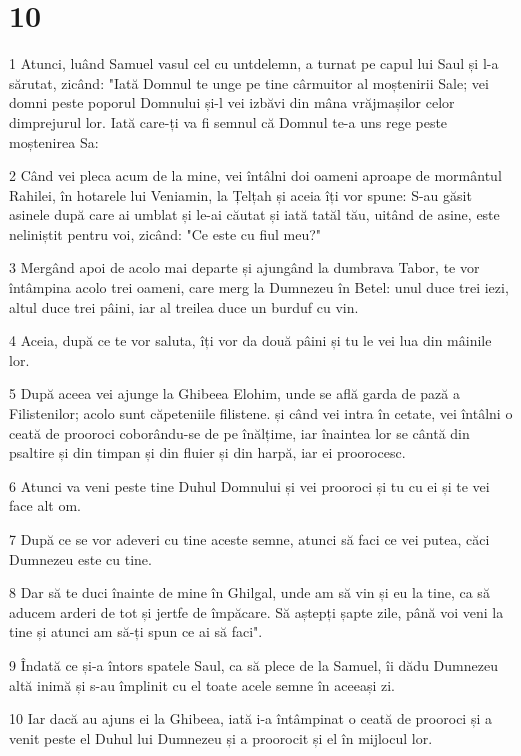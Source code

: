 \chapter{10}

\par 1 Atunci, luând Samuel vasul cel cu untdelemn, a turnat pe capul lui Saul și l-a sărutat, zicând: "Iată Domnul te unge pe tine cârmuitor al moștenirii Sale; vei domni peste poporul Domnului și-l vei izbăvi din mâna vrăjmașilor celor dimprejurul lor. Iată care-ți va fi semnul că Domnul te-a uns rege peste moștenirea Sa:
\par 2 Când vei pleca acum de la mine, vei întâlni doi oameni aproape de mormântul Rahilei, în hotarele lui Veniamin, la Țelțah și aceia îți vor spune: S-au găsit asinele după care ai umblat și le-ai căutat și iată tatăl tău, uitând de asine, este neliniștit pentru voi, zicând: "Ce este cu fiul meu?"
\par 3 Mergând apoi de acolo mai departe și ajungând la dumbrava Tabor, te vor întâmpina acolo trei oameni, care merg la Dumnezeu în Betel: unul duce trei iezi, altul duce trei pâini, iar al treilea duce un burduf cu vin.
\par 4 Aceia, după ce te vor saluta, îți vor da două pâini și tu le vei lua din mâinile lor.
\par 5 După aceea vei ajunge la Ghibeea Elohim, unde se află garda de pază a Filistenilor; acolo sunt căpeteniile filistene. și când vei intra în cetate, vei întâlni o ceată de prooroci coborându-se de pe înălțime, iar înaintea lor se cântă din psaltire și din timpan și din fluier și din harpă, iar ei proorocesc.
\par 6 Atunci va veni peste tine Duhul Domnului și vei prooroci și tu cu ei și te vei face alt om.
\par 7 După ce se vor adeveri cu tine aceste semne, atunci să faci ce vei putea, căci Dumnezeu este cu tine.
\par 8 Dar să te duci înainte de mine în Ghilgal, unde am să vin și eu la tine, ca să aducem arderi de tot și jertfe de împăcare. Să aștepți șapte zile, până voi veni la tine și atunci am să-ți spun ce ai să faci".
\par 9 Îndată ce și-a întors spatele Saul, ca să plece de la Samuel, îi dădu Dumnezeu altă inimă și s-au împlinit cu el toate acele semne în aceeași zi.
\par 10 Iar dacă au ajuns ei la Ghibeea, iată i-a întâmpinat o ceată de prooroci și a venit peste el Duhul lui Dumnezeu și a proorocit și el în mijlocul lor.

